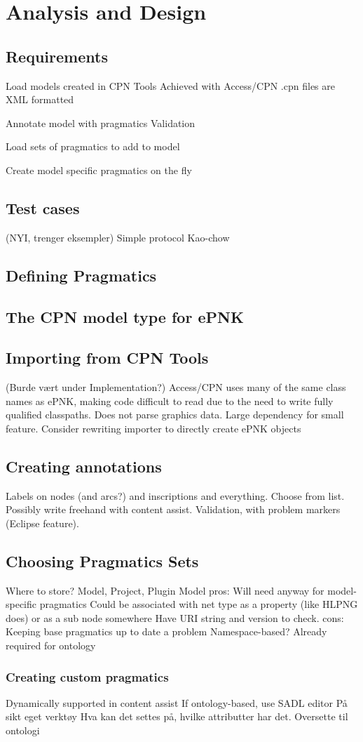 \chapter{Analysis and Design}
\label{chap:analysis}

\section{Requirements} 
Load models created in CPN Tools
	Achieved with Access/CPN
	.cpn files are XML formatted

Annotate model with pragmatics
	Validation

Load sets of pragmatics to add to model

Create model specific pragmatics on the fly

\section{Test cases}

(NYI, trenger eksempler)
Simple protocol
Kao-chow


\section{Defining Pragmatics}




\section{The CPN model type for ePNK}


\section{Importing from CPN Tools}
(Burde vært under Implementation?)
Access/CPN uses many of the same class names as ePNK, making code difficult to
read due to the need to write fully qualified classpaths.
Does not parse graphics data.
Large dependency for small feature.
Consider rewriting importer to directly create ePNK objects

\section{Creating annotations}
Labels on nodes (and arcs?) and inscriptions and everything. 
Choose from list. Possibly write freehand with content assist. Validation, with
problem markers (Eclipse feature).

\section{Choosing Pragmatics Sets}
Where to store? Model, Project, Plugin
Model pros:
	Will need anyway for model-specific pragmatics
	Could be associated with net type as a property (like HLPNG does) or as a sub
	node somewhere
	Have URI string and version to check.
cons:
	Keeping base pragmatics up to date a problem
Namespace-based? Already required for ontology


	\subsection{Creating custom pragmatics}
	Dynamically supported in content assist 
	If ontology-based, use SADL editor
	På sikt eget verktøy
		Hva kan det settes på, hvilke attributter har det.
		Oversette til ontologi

